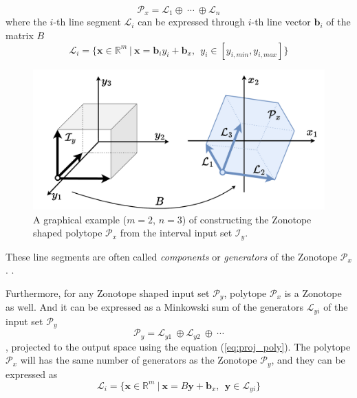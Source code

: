 \begin{equation}
    \mathcal{P}_x = \mathcal{L}_1 \oplus~ \cdots ~\oplus \mathcal{L}_n
\end{equation}
where the $i$-th line segment $\mathcal{L}_i$ can be expressed through $i$-th line vector $\bm{b}_i$ of the matrix $B$
\begin{equation}
    \mathcal{L}_i = \{\bm{x}\in\mathbb{R}^m ~|~ \bm{x} = \bm{b}_iy_i + \bm{b}_x,~~ y_i\in [y_{i,min}, y_{i,max}] \}
\end{equation}
\begin{figure}
    \centering
    \includegraphics[width=\linewidth]{Chapters/imgs/zonotope_only.pdf}
    \caption{A graphical example ($m=2$, $n=3$) of constructing the Zonotope shaped polytope $\mathcal{P}_x$ from the interval input set $\mathcal{I}_y$.}
    \label{fig:image_projection_two}
\end{figure}
These line segments are often called \textit{components} or \textit{generators} of the Zonotope $\mathcal{P}_x$. \cite{shephard1974zonotopes}.

Furthermore, for any Zonotope shaped input set $\mathcal{P}_y$, polytope $\mathcal{P}_x$ is a Zonotope as well. And it can be expressed as a Minkowski sum of the generators $\mathcal{L}_{yi}$ of the input set $\mathcal{P}_y$
\begin{equation}
    \mathcal{P}_y = \mathcal{L}_{y1}  ~\oplus \mathcal{L}_{y2}~\oplus~ \cdots
\end{equation}
, projected to the output space using the equation (\ref{eq:proj_poly}). The polytope $\mathcal{P}_x$ will has the same number of generators as the Zonotope $\mathcal{P}_y$, and they can be expressed as
\begin{equation}
    \mathcal{L}_i = \{\bm{x}\in\mathbb{R}^m ~|~ \bm{x} = B\bm{y} + \bm{b}_x,~~ \bm{y}\in  \mathcal{L}_{yi}\}
\end{equation}

